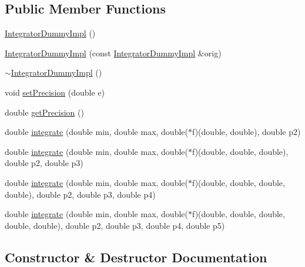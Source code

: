 \subsection*{Public Member Functions}
\begin{DoxyCompactItemize}
\item 
\hyperlink{class_integrator_dummy_impl_a25f62c9c0bdba5e42ee2cf2dfa895d26}{Integrator\+Dummy\+Impl} ()
\item 
\hyperlink{class_integrator_dummy_impl_a04202151391a419d6eb38cbd8031ba3d}{Integrator\+Dummy\+Impl} (const \hyperlink{class_integrator_dummy_impl}{Integrator\+Dummy\+Impl} \&orig)
\item 
\hyperlink{class_integrator_dummy_impl_a4d195f9a114c69cfd0aa268a74973904}{$\sim$\+Integrator\+Dummy\+Impl} ()
\item 
void \hyperlink{class_integrator_dummy_impl_a8d246dd846c280ae6475ab753ee0cb53}{set\+Precision} (double e)
\item 
double \hyperlink{class_integrator_dummy_impl_a5c84a3117db426808d9488b67b60889d}{get\+Precision} ()
\item 
double \hyperlink{class_integrator_dummy_impl_a4a7b142f7c94077b8bb6e4bcf8071b4b}{integrate} (double min, double max, double($\ast$f)(double, double), double p2)
\item 
double \hyperlink{class_integrator_dummy_impl_a19285353d908f47c1b76a8aedb3a16f1}{integrate} (double min, double max, double($\ast$f)(double, double, double), double p2, double p3)
\item 
double \hyperlink{class_integrator_dummy_impl_a7970145911ce0fc0ab990128bda5efde}{integrate} (double min, double max, double($\ast$f)(double, double, double, double), double p2, double p3, double p4)
\item 
double \hyperlink{class_integrator_dummy_impl_af78c8e47fa17cef32d02f79e47845bd3}{integrate} (double min, double max, double($\ast$f)(double, double, double, double, double), double p2, double p3, double p4, double p5)
\end{DoxyCompactItemize}


\subsection{Constructor \& Destructor Documentation}
